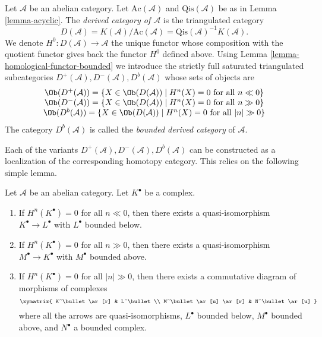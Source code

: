 \begin{definition}
\label{definition-unbounded-derived-category}
Let $\mathcal{A}$ be an abelian category.
Let $\text{Ac}(\mathcal{A})$ and $\text{Qis}(\mathcal{A})$
be as in
Lemma \ref{lemma-acyclic}.
The {\it derived category of $\mathcal{A}$} is the triangulated
category
$$
D(\mathcal{A}) =
K(\mathcal{A})/\text{Ac}(\mathcal{A}) =
\text{Qis}(\mathcal{A})^{-1} K(\mathcal{A}).
$$
We denote $H^0 : D(\mathcal{A}) \to \mathcal{A}$ the unique functor
whose composition with the quotient functor gives back the functor
$H^0$ defined above. Using
Lemma \ref{lemma-homological-functor-bounded}
we introduce the strictly full saturated triangulated subcategories
$D^{+}(\mathcal{A}), D^{-}(\mathcal{A}), D^b(\mathcal{A})$
whose sets of objects are
$$
\begin{matrix}
\Ob(D^{+}(\mathcal{A})) =
\{X \in \Ob(D(\mathcal{A})) \mid
H^n(X) = 0\text{ for all }n \ll 0\} \\
\Ob(D^{-}(\mathcal{A})) =
\{X \in \Ob(D(\mathcal{A})) \mid
H^n(X) = 0\text{ for all }n \gg 0\} \\
\Ob(D^b(\mathcal{A})) =
\{X \in \Ob(D(\mathcal{A})) \mid
H^n(X) = 0\text{ for all }|n| \gg 0\}
\end{matrix}
$$
The category $D^b(\mathcal{A})$ is called the {\it bounded derived
category} of $\mathcal{A}$.
\end{definition}

\noindent
Each of the variants $D^{+}(\mathcal{A}), D^{-}(\mathcal{A}), D^b(\mathcal{A})$
can be constructed as a localization of the corresponding homotopy category.
This relies on the following simple lemma.

\begin{lemma}
\label{lemma-complex-cohomology-bounded}
Let $\mathcal{A}$ be an abelian category.
Let $K^\bullet$ be a complex.
\begin{enumerate}
\item If $H^n(K^\bullet) = 0$ for all $n \ll 0$, then there exists
a quasi-isomorphism $K^\bullet \to L^\bullet$ with $L^\bullet$
bounded below.
\item If $H^n(K^\bullet) = 0$ for all $n \gg 0$, then there exists
a quasi-isomorphism $M^\bullet \to K^\bullet$ with $M^\bullet$
bounded above.
\item If $H^n(K^\bullet) = 0$ for all $|n| \gg 0$, then there exists
a commutative diagram of morphisms of complexes
$$
\xymatrix{
K^\bullet \ar[r] & L^\bullet \\
M^\bullet \ar[u] \ar[r] & N^\bullet \ar[u]
}
$$
where all the arrows are quasi-isomorphisms, $L^\bullet$
bounded below, $M^\bullet$ bounded above, and $N^\bullet$ a bounded
complex.
\end{enumerate}
\end{lemma}

